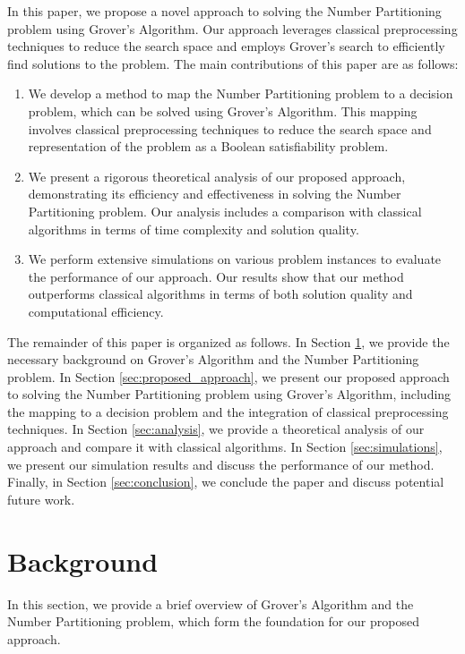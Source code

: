 In this paper, we propose a novel approach to solving the Number Partitioning problem using Grover's Algorithm. Our approach leverages classical preprocessing techniques to reduce the search space and employs Grover's search to efficiently find solutions to the problem. The main contributions of this paper are as follows:

\begin{enumerate}
    \item We develop a method to map the Number Partitioning problem to a decision problem, which can be solved using Grover's Algorithm. This mapping involves classical preprocessing techniques to reduce the search space and representation of the problem as a Boolean satisfiability problem.
    
    \item We present a rigorous theoretical analysis of our proposed approach, demonstrating its efficiency and effectiveness in solving the Number Partitioning problem. Our analysis includes a comparison with classical algorithms in terms of time complexity and solution quality.
    
    \item We perform extensive simulations on various problem instances to evaluate the performance of our approach. Our results show that our method outperforms classical algorithms in terms of both solution quality and computational efficiency.
\end{enumerate}

The remainder of this paper is organized as follows. In Section \ref{sec:background}, we provide the necessary background on Grover's Algorithm and the Number Partitioning problem. In Section \ref{sec:proposed_approach}, we present our proposed approach to solving the Number Partitioning problem using Grover's Algorithm, including the mapping to a decision problem and the integration of classical preprocessing techniques. In Section \ref{sec:analysis}, we provide a theoretical analysis of our approach and compare it with classical algorithms. In Section \ref{sec:simulations}, we present our simulation results and discuss the performance of our method. Finally, in Section \ref{sec:conclusion}, we conclude the paper and discuss potential future work.

\section{Background} \label{sec:background}
In this section, we provide a brief overview of Grover's Algorithm and the Number Partitioning problem, which form the foundation for our proposed approach.

